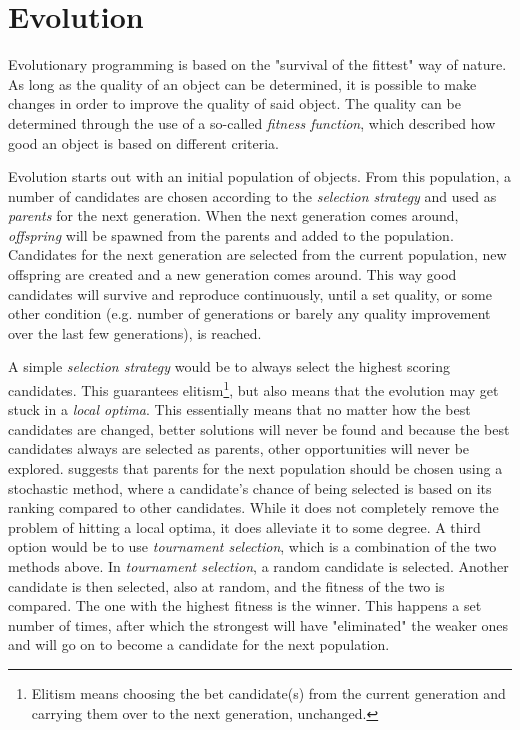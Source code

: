 \section{Evolution}
\label{methodology_evolution}

Evolutionary programming\cite{eiben2008introduction, eiben2002evolutionary} is based on the "survival of the fittest" way of nature. As long as the quality of an object can be determined, it is possible to make changes in order to improve the quality of said object. The quality can be determined through the use of a so-called \textit{fitness function}, which described how good an object is based on different criteria.

Evolution starts out with an initial population of objects. From this population, a number of candidates are chosen according to the \textit{selection strategy} and used as \textit{parents} for the next generation. When the next generation comes around, \textit{offspring} will be spawned from the parents and added to the population. Candidates for the next generation are selected from the current population, new offspring are created and a new generation comes around. This way good candidates will survive and reproduce continuously, until a set quality, or some other condition (e.g. number of generations or barely any quality improvement over the last few generations), is reached.

A simple \textit{selection strategy} would be to always select the highest scoring candidates. This guarantees elitism\footnote{Elitism means choosing the bet candidate(s) from the current generation and carrying them over to the next generation, unchanged.}, but also means that the evolution may get stuck in a \textit{local optima}. This essentially means that no matter how the best candidates are changed, better solutions will never be found and because the best candidates always are selected as parents, other opportunities will never be explored. \citeauthor{rocha1999preventing}\cite{rocha1999preventing} suggests that parents for the next population should be chosen using a stochastic method, where a candidate's chance of being selected is based on its ranking compared to other candidates. While it does not completely remove the problem of hitting a local optima, it does alleviate it to some degree. A third option would be to use \textit{tournament selection}, which is a combination of the two methods above. In \textit{tournament selection}, a random candidate is selected. Another candidate is then selected, also at random, and the fitness of the two is compared. The one with the highest fitness is the winner. This happens a set number of times, after which the strongest will have "eliminated" the weaker ones and will go on to become a candidate for the next population.

